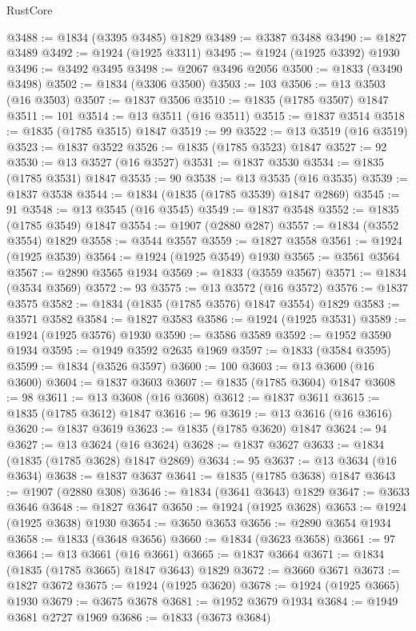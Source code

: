 \begin{lexlean}{RustCore}
\begin{coremodule}
@3488 := @1834 (@3395 @3485) @1829
@3489 := @3387 @3488
@3490 := @1827 @3489
@3492 := @1924 (@1925 @3311)
@3495 := @1924 (@1925 @3392) @1930
@3496 := @3492 @3495
@3498 := @2067 @3496 @2056
@3500 := @1833 (@3490 @3498)
@3502 := @1834 (@3306 @3500)
@3503 := 103
@3506 := @13 @3503 (@16 @3503)
@3507 := @1837 @3506
@3510 := @1835 (@1785 @3507) @1847
@3511 := 101
@3514 := @13 @3511 (@16 @3511)
@3515 := @1837 @3514
@3518 := @1835 (@1785 @3515) @1847
@3519 := 99
@3522 := @13 @3519 (@16 @3519)
@3523 := @1837 @3522
@3526 := @1835 (@1785 @3523) @1847
@3527 := 92
@3530 := @13 @3527 (@16 @3527)
@3531 := @1837 @3530
@3534 := @1835 (@1785 @3531) @1847
@3535 := 90
@3538 := @13 @3535 (@16 @3535)
@3539 := @1837 @3538
@3544 := @1834 (@1835 (@1785 @3539) @1847 @2869)
@3545 := 91
@3548 := @13 @3545 (@16 @3545)
@3549 := @1837 @3548
@3552 := @1835 (@1785 @3549) @1847
@3554 := @1907 (@2880 @287)
@3557 := @1834 (@3552 @3554) @1829
@3558 := @3544 @3557
@3559 := @1827 @3558
@3561 := @1924 (@1925 @3539)
@3564 := @1924 (@1925 @3549) @1930
@3565 := @3561 @3564
@3567 := @2890 @3565 @1934
@3569 := @1833 (@3559 @3567)
@3571 := @1834 (@3534 @3569)
@3572 := 93
@3575 := @13 @3572 (@16 @3572)
@3576 := @1837 @3575
@3582 := @1834 (@1835 (@1785 @3576) @1847 @3554) @1829
@3583 := @3571 @3582
@3584 := @1827 @3583
@3586 := @1924 (@1925 @3531)
@3589 := @1924 (@1925 @3576) @1930
@3590 := @3586 @3589
@3592 := @1952 @3590 @1934
@3595 := @1949 @3592 @2635 @1969
@3597 := @1833 (@3584 @3595)
@3599 := @1834 (@3526 @3597)
@3600 := 100
@3603 := @13 @3600 (@16 @3600)
@3604 := @1837 @3603
@3607 := @1835 (@1785 @3604) @1847
@3608 := 98
@3611 := @13 @3608 (@16 @3608)
@3612 := @1837 @3611
@3615 := @1835 (@1785 @3612) @1847
@3616 := 96
@3619 := @13 @3616 (@16 @3616)
@3620 := @1837 @3619
@3623 := @1835 (@1785 @3620) @1847
@3624 := 94
@3627 := @13 @3624 (@16 @3624)
@3628 := @1837 @3627
@3633 := @1834 (@1835 (@1785 @3628) @1847 @2869)
@3634 := 95
@3637 := @13 @3634 (@16 @3634)
@3638 := @1837 @3637
@3641 := @1835 (@1785 @3638) @1847
@3643 := @1907 (@2880 @308)
@3646 := @1834 (@3641 @3643) @1829
@3647 := @3633 @3646
@3648 := @1827 @3647
@3650 := @1924 (@1925 @3628)
@3653 := @1924 (@1925 @3638) @1930
@3654 := @3650 @3653
@3656 := @2890 @3654 @1934
@3658 := @1833 (@3648 @3656)
@3660 := @1834 (@3623 @3658)
@3661 := 97
@3664 := @13 @3661 (@16 @3661)
@3665 := @1837 @3664
@3671 := @1834 (@1835 (@1785 @3665) @1847 @3643) @1829
@3672 := @3660 @3671
@3673 := @1827 @3672
@3675 := @1924 (@1925 @3620)
@3678 := @1924 (@1925 @3665) @1930
@3679 := @3675 @3678
@3681 := @1952 @3679 @1934
@3684 := @1949 @3681 @2727 @1969
@3686 := @1833 (@3673 @3684)

\end{coremodule}
\end{lexlean}
